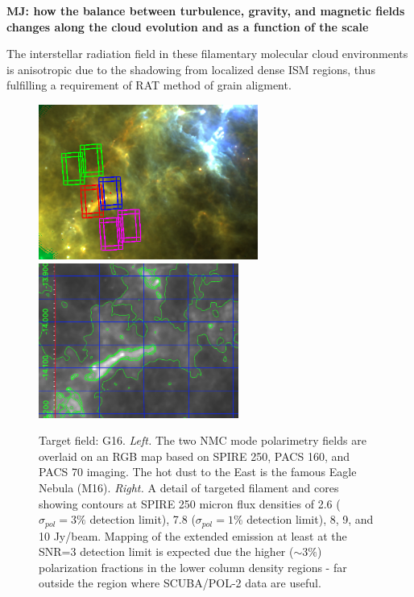 \documentclass[11pt]{amsart}
\begin{document}
{{\bf MJ: how the balance between turbulence, gravity, and magnetic fields changes along the cloud evolution and as a function of the scale}

The interstellar radiation field in these filamentary molecular cloud environments is anisotropic due to the shadowing from localized dense ISM regions, thus fulfilling a requirement of  RAT method of grain aligment.

\begin{figure}
\includegraphics[height=2in]{g16_nmc.png}
\includegraphics[height=2in]{g16_c3a.png}
\caption{Target field: G16. {\it Left.}  The two NMC mode polarimetry fields are overlaid on an RGB map based on SPIRE 250, PACS 160, and PACS 70 imaging.  The hot dust to the East is the famous Eagle Nebula (M16).  {\it Right.} A detail of targeted filament and cores showing contours at SPIRE 250 micron flux densities of 2.6 ($\sigma_{pol} = 3\%$ detection limit), 7.8 ($\sigma_{pol} = 1\%$ detection limit), 8, 9, and 10 Jy/beam. Mapping of the extended emission at least at the SNR=3 detection limit is expected due the higher ($\sim3\%$) polarization fractions in the lower column density regions - far outside the region where SCUBA/POL-2 data are useful.
\label{fig:fields}}
\end{figure}


}
\end{document}
